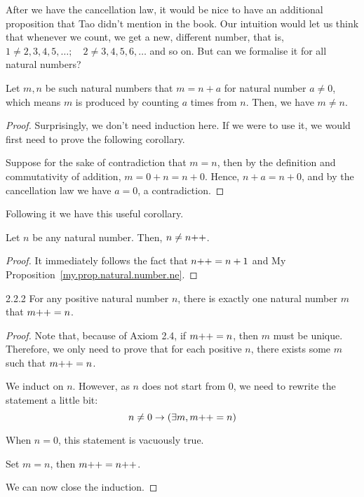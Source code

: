 After we have the cancellation law, it would be nice to have an additional proposition that Tao didn't mention in the book. Our intuition would let us think that whenever we count, we get a new, different number, that is, $1\ne 2,3,4,5,\dots;\quad 2\ne 3,4,5,6,\dots$ and so on. But can we formalise it for all natural numbers?
\begin{prop}\label{my.prop.natural.number.ne}
Let $m,n$ be such natural numbers that $m=n+a$ for natural number $a\ne 0$, which means $m$ is produced by counting $a$ times from $n$. Then, we have $m \ne n$.
\end{prop}
\begin{proof}
Surprisingly, we don't need induction here. If we were to use it, we would first need to prove the following corollary.

Suppose for the sake of contradiction that $m=n$, then by the definition and commutativity of addition, $m=0+n=n+0$. Hence, $n+a=n+0$, and by the cancellation law we have $a=0$, a contradiction.
\end{proof}

Following it we have this useful corollary.
\begin{coro}
Let $n$ be any natural number. Then, $n\ne n{+}{+}$.
\end{coro}

\begin{proof}
It immediately follows the fact that $n{+}{+} = n+1$ and My Proposition~\ref{my.prop.natural.number.ne}.
\end{proof}

\begin{exercise}{2.2.2}
For any positive natural number $n$, there is exactly one natural number $m$ that $m{+}{+} = n$. 
\end{exercise}

\begin{proof}
Note that, because of Axiom 2.4, if $m{+}{+} = n$, then $m$ must be unique. Therefore, we only need to prove that for each positive $n$, there exists some $m$ such that $m{+}{+} = n$.
	
We induct on $n$. However, as $n$ does not start from $0$, we need to rewrite the statement a little bit:
$$
n \ne 0 \to (\exists m, m{+}{+} = n)
$$

 When $n = 0$, this statement is vacuously true.

 Set $m=n$, then $m{+}{+} = n{+}{+}$.

We can now close the induction.
\end{proof}

